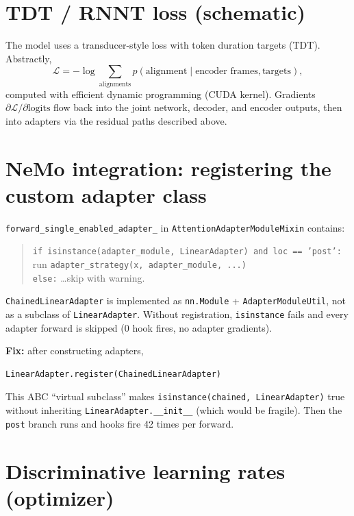 \documentclass[11pt,a4paper]{article}
\begin{document}
\section{TDT / RNNT loss (schematic)}

The model uses a transducer-style loss with token duration targets (TDT). Abstractly,
\[
  \mathcal{L} = -\log \sum_{\text{alignments}} p(\text{alignment} \mid \text{encoder frames}, \text{targets}),
\]
computed with efficient dynamic programming (CUDA kernel). Gradients $\partial\mathcal{L}/\partial \text{logits}$ flow back into the joint network, decoder, and encoder outputs, then into adapters via the residual paths described above.

\section{NeMo integration: registering the custom adapter class}

\texttt{forward\_single\_enabled\_adapter\_} in \texttt{AttentionAdapterModuleMixin} contains:
\begin{quote}\small
\texttt{if isinstance(adapter\_module, LinearAdapter) and loc == 'post':}\\
\quad run \texttt{adapter\_strategy(x, adapter\_module, ...)}\\
\texttt{else:} \ldots skip with warning.
\end{quote}
\texttt{ChainedLinearAdapter} is implemented as \texttt{nn.Module} + \texttt{AdapterModuleUtil}, not as a subclass of \texttt{LinearAdapter}. Without registration, \texttt{isinstance} fails and every adapter forward is skipped (0 hook fires, no adapter gradients).

\noindent\textbf{Fix:} after constructing adapters,
\begin{verbatim}
LinearAdapter.register(ChainedLinearAdapter)
\end{verbatim}
This ABC ``virtual subclass'' makes \texttt{isinstance(chained, LinearAdapter)} true without inheriting \texttt{LinearAdapter.\_\_init\_\_} (which would be fragile). Then the \texttt{post} branch runs and hooks fire 42 times per forward.

\section{Discriminative learning rates (optimizer)}
\end{document}
